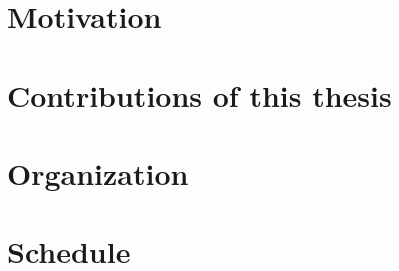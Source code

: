 \section{Motivation}
\label{motivation}


\section{Contributions of this thesis}
\label{contributions}


\section{Organization}
\label{organization}

 
\section{Schedule}
\label{schedule}

